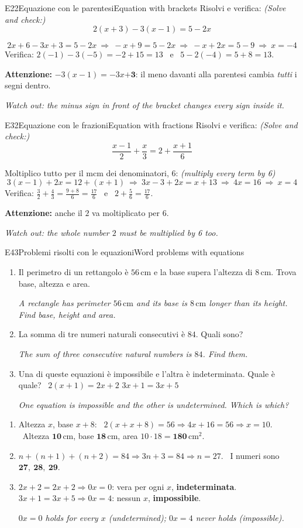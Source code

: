 \documentclass[11pt,a4paper]{article}
\newcommand{\en}[1]{\par{\small\itshape\color{engray}#1\par}}
\newcommand{\enx}[1]{{\small\itshape\color{engray}(#1)}}
\newcommand{\unit}[1]{\,\mathrm{#1}}
\newcommand{\cm}{\unit{cm}}
\newcommand{\cmq}{\unit{cm^2}}
\newcommand{\errore}[2]{\begin{attenzione}\textbf{\color{fgA}Attenzione:} #1\par
  {\itshape\color{engray}Watch out: #2}\end{attenzione}}
\begin{document}
\begin{esercizio}{E2}{2}{Equazione con le parentesi}{Equation with brackets}
Risolvi e verifica: \enx{Solve and check:}
\[2(x+3)-3(x-1)=5-2x\]
\end{esercizio}
\begin{solbox}
\[2x+6-3x+3=5-2x\ \Rightarrow\ -x+9=5-2x\ \Rightarrow\ -x+2x=5-9\ \Rightarrow\ \boxed{x=-4}\]
Verifica: $2(-1)-3(-5)=-2+15=13$ \ e \ $5-2(-4)=5+8=13$. \checkmark
\errore{$-3(x-1)=-3x\mathbf{+3}$: il meno davanti alla parentesi cambia \emph{tutti} i segni dentro.}
{the minus sign in front of the bracket changes every sign inside it.}
\end{solbox}

\begin{esercizio}{E3}{2}{Equazione con le frazioni}{Equation with fractions}
Risolvi e verifica: \enx{Solve and check:}
\[\frac{x-1}{2}+\frac{x}{3}=2+\frac{x+1}{6}\]
\end{esercizio}
\begin{solbox}
Moltiplico tutto per il mcm dei denominatori, $6$: \enx{multiply every term by 6}
\[3(x-1)+2x=12+(x+1)\ \Rightarrow\ 3x-3+2x=x+13\ \Rightarrow\ 4x=16\ \Rightarrow\ \boxed{x=4}\]
Verifica: $\frac32+\frac43=\frac{9+8}{6}=\frac{17}{6}$ \ e \ $2+\frac56=\frac{17}{6}$. \checkmark
\errore{anche il $2$ va moltiplicato per $6$.}{the whole number $2$ must be multiplied by 6 too.}
\end{solbox}

\begin{esercizio}{E4}{3}{Problemi risolti con le equazioni}{Word problems with equations}
\begin{enumerate}
\item Il perimetro di un rettangolo è $56\cm$ e la base supera l'altezza di $8\cm$. Trova base, altezza e area.
\en{A rectangle has perimeter $56\cm$ and its base is $8\cm$ longer than its height. Find base, height and area.}
\item La somma di tre numeri naturali consecutivi è $84$. Quali sono?
\en{The sum of three consecutive natural numbers is $84$. Find them.}
\item Una di queste equazioni è impossibile e l'altra è indeterminata. Quale è quale? \ $2(x+1)=2x+2$ \quad $3x+1=3x+5$
\en{One equation is impossible and the other is undetermined. Which is which?}
\end{enumerate}
\end{esercizio}
\begin{solbox}
\begin{enumerate}
\item Altezza $x$, base $x+8$: \ $2(x+x+8)=56\Rightarrow 4x+16=56\Rightarrow x=10$. \ Altezza $\mathbf{10\cm}$, base $\mathbf{18\cm}$, area $10\cdot18=\mathbf{180\cmq}$.
\item $n+(n+1)+(n+2)=84\Rightarrow 3n+3=84\Rightarrow n=27$. \ I numeri sono $\mathbf{27,\ 28,\ 29}$.
\item $2x+2=2x+2\Rightarrow 0x=0$: vera per ogni $x$, \textbf{indeterminata}. \quad $3x+1=3x+5\Rightarrow 0x=4$: nessun $x$, \textbf{impossibile}.
\en{$0x=0$ holds for every $x$ (undetermined); $0x=4$ never holds (impossible).}
\end{enumerate}
\end{solbox}
\end{document}

